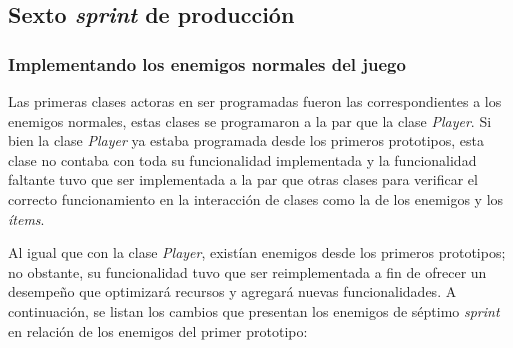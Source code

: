 \subsection{Sexto \textit{sprint} de producción}


\subsubsection{Implementando los enemigos normales del juego} 
Las primeras clases actoras en ser programadas fueron las correspondientes a los 
enemigos normales, estas clases se programaron a la par que la clase \textit{Player}. 
Si bien la clase \textit{Player} ya estaba programada desde los primeros prototipos, 
esta clase no contaba con toda su funcionalidad implementada y la funcionalidad 
faltante tuvo que ser implementada a la par que otras clases para verificar el 
correcto funcionamiento en la interacción de clases como la de los enemigos y los 
\textit{ítems}.
\\
\par 
Al igual que con la clase \textit{Player},  existían enemigos desde los primeros prototipos; no obstante, 
su funcionalidad tuvo que ser reimplementada a fin de ofrecer un desempeño que 
optimizará recursos y agregará nuevas funcionalidades. A continuación, se listan los 
cambios que presentan los enemigos de séptimo \textit{sprint} en relación de los 
enemigos del primer prototipo: 

